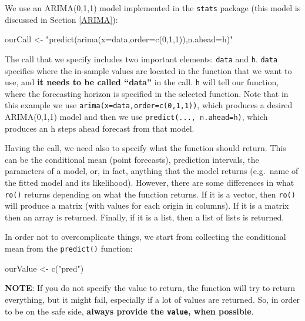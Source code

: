 \documentclass[
]{book}
\newenvironment{Shaded}{\begin{snugshade}}{\end{snugshade}}
\newcommand{\FunctionTok}[1]{\textcolor[rgb]{0.00,0.00,0.00}{#1}}
\newcommand{\NormalTok}[1]{#1}
\newcommand{\OtherTok}[1]{\textcolor[rgb]{0.56,0.35,0.01}{#1}}
\newcommand{\StringTok}[1]{\textcolor[rgb]{0.31,0.60,0.02}{#1}}
\theoremstyle{definition}
\theoremstyle{definition}
\theoremstyle{definition}
\theoremstyle{definition}
\theoremstyle{remark}
\begin{document}
We use an ARIMA(0,1,1) model implemented in the \texttt{stats} package (this model is discussed in Section \ref{ARIMA}):

\begin{Shaded}
\begin{Highlighting}[]
\NormalTok{ourCall }\OtherTok{\textless{}{-}} \StringTok{"predict(arima(x=data,order=c(0,1,1)),n.ahead=h)"}
\end{Highlighting}
\end{Shaded}

The call that we specify includes two important elements: \texttt{data} and \texttt{h}. \texttt{data} specifies where the in-sample values are located in the function that we want to use, and \textbf{it needs to be called ``data''} in the call. \texttt{h} will tell our function, where the forecasting horizon is specified in the selected function. Note that in this example we use \texttt{arima(x=data,order=c(0,1,1))}, which produces a desired ARIMA(0,1,1) model and then we use \texttt{predict(...,\ n.ahead=h)}, which produces an h steps ahead forecast from that model.

Having the call, we need also to specify what the function should return. This can be the conditional mean (point forecasts), prediction intervals, the parameters of a model, or, in fact, anything that the model returns (e.g.~name of the fitted model and its likelihood). However, there are some differences in what \texttt{ro()} returns depending on what the function returns. If it is a vector, then \texttt{ro()} will produce a matrix (with values for each origin in columns). If it is a matrix then an array is returned. Finally, if it is a list, then a list of lists is returned.

In order not to overcomplicate things, we start from collecting the conditional mean from the \texttt{predict()} function:

\begin{Shaded}
\begin{Highlighting}[]
\NormalTok{ourValue }\OtherTok{\textless{}{-}} \FunctionTok{c}\NormalTok{(}\StringTok{"pred"}\NormalTok{)}
\end{Highlighting}
\end{Shaded}

\textbf{NOTE}: If you do not specify the value to return, the function will try to return everything, but it might fail, especially if a lot of values are returned. So, in order to be on the safe side, \textbf{always provide the \texttt{value}, when possible}.
\end{document}
